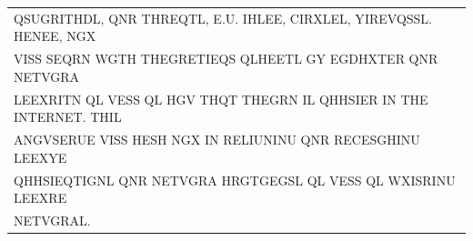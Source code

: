 \documentclass[aspectratio=169, lualatex, 10pt,dvipsnames,svgnames]{beamer} %
\def\enbleu#1{\textcolor{bleu}{#1}}
\begin{document}
\begin{frame}
{\begin{tabular}[t]{l}
      QSUG\enbleu{R}\enbleu{I}\enbleu{T}\enbleu{H}DL, Q\enbleu{N}R \enbleu{T}\enbleu{H}\enbleu{R}\enbleu{E}Q\enbleu{T}L, \enbleu{E}.U. \enbleu{I}HL\enbleu{E}E, C\enbleu{I}\enbleu{R}XL\enbleu{E}L, Y\enbleu{I}\enbleu{R}\enbleu{E}VQSSL. \enbleu{H}\enbleu{E}\enbleu{N}E\enbleu{E}, NGX \\
      V\enbleu{I}SS S\enbleu{E}Q\enbleu{R}\enbleu{N} WG\enbleu{T}\enbleu{H} \enbleu{T}\enbleu{H}\enbleu{E}G\enbleu{R}\enbleu{E}\enbleu{T}\enbleu{I}EQS QLH\enbleu{E}E\enbleu{T}L GY EGDHX\enbleu{T}\enbleu{E}\enbleu{R} Q\enbleu{N}R \enbleu{N}\enbleu{E}\enbleu{T}VG\enbleu{R}A \\
      L\enbleu{E}EX\enbleu{R}\enbleu{I}\enbleu{T}N QL V\enbleu{E}SS QL \enbleu{H}GV \enbleu{T}\enbleu{H}Q\enbleu{T} \enbleu{T}\enbleu{H}\enbleu{E}G\enbleu{R}N \enbleu{I}L QHHS\enbleu{I}\enbleu{E}R \enbleu{I}\enbleu{N} \enbleu{T}\enbleu{H}\enbleu{E} \enbleu{I}\enbleu{N}\enbleu{T}\enbleu{E}\enbleu{R}\enbleu{N}\enbleu{E}\enbleu{T}. \enbleu{T}\enbleu{H}\enbleu{I}L \\
      A\enbleu{N}GVS\enbleu{E}RU\enbleu{E} V\enbleu{I}SS \enbleu{H}\enbleu{E}SH NGX \enbleu{I}\enbleu{N} R\enbleu{E}L\enbleu{I}U\enbleu{N}\enbleu{I}\enbleu{N}U Q\enbleu{N}R R\enbleu{E}C\enbleu{E}SGH\enbleu{I}\enbleu{N}U L\enbleu{E}EXY\enbleu{E} \\
      QHHS\enbleu{I}EQ\enbleu{T}\enbleu{I}G\enbleu{N}L Q\enbleu{N}R \enbleu{N}\enbleu{E}\enbleu{T}VG\enbleu{R}A H\enbleu{R}G\enbleu{T}GEGSL QL V\enbleu{E}SS QL WX\enbleu{I}SR\enbleu{I}\enbleu{N}U L\enbleu{E}EX\enbleu{R}\enbleu{E} \\
      \enbleu{N}\enbleu{E}\enbleu{T}VG\enbleu{R}AL.
    \end{tabular}
  }
  \vspace{0.5cm}

  \normalsize
  
  \color{black}
\end{frame}
\end{document}
